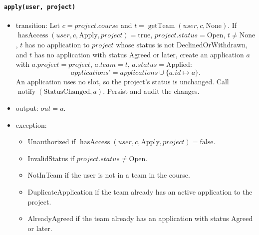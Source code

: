 \documentclass[12pt, titlepage]{article}
\begin{document}
\paragraph{\texttt{apply(user, project)}}
\begin{itemize}
    \item transition: Let $c=project.course$ and $t=\operatorname{getTeam}(user,c,\text{None})$. If $\operatorname{hasAccess}(user,c,\text{Apply},project)=\text{true}$, $project.status=\text{Open}$, $t\ne\text{None}$, $t$ has no application to $project$ whose status is not DeclinedOrWithdrawn, and $t$ has no application with status Agreed or later, create an application $a$ with $a.project=project$, $a.team=t$, $a.status=\text{Applied}$:
    \[
    \mathit{applications}'=\mathit{applications}\cup\{a.id\mapsto a\}.
    \]
    An application uses no slot, so the project's status is unchanged. Call $\operatorname{notify}(\text{StatusChanged},a)$. Persist and audit the changes.
    \item output: $out=a$.
    \item exception:
    \begin{itemize}
        \item Unauthorized if $\operatorname{hasAccess}(user,c,\text{Apply},project)=\text{false}$.
        \item InvalidStatus if $project.status\ne\text{Open}$.
        \item NotInTeam if the user is not in a team in the course.
        \item DuplicateApplication if the team already has an active application to the project.
        \item AlreadyAgreed if the team already has an application with status Agreed or later.
    \end{itemize}
\end{itemize}
\end{document}
